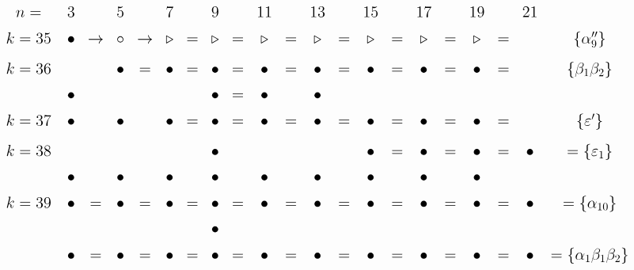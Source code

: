 \documentclass{article}
\begin{document}
\(
\begin{tikzcd}[nodes={font=\Large},row sep=0.2cm,column sep=0.1cm]
n= & & 3 & & 5 & & 7 & & 9 & & 11 & & 13 & & 15 & & 17 && 19 && 21  \\
k=35 && \bullet &\rightarrow& \circ &\rightarrow& \triangleright &=& \triangleright &=& \triangleright &=& \triangleright &=& \triangleright  &=& \triangleright &=& \triangleright &=& & \{\alpha''_9\} \\
k=36 && && \bullet &=& \bullet &=& \bullet &=& \bullet &=& \bullet &=& \bullet &=& \bullet &=& \bullet &=&& \{\beta_1\beta_2\} \\
&& \bullet && && && \bullet &=& \bullet && \bullet \\
k=37 && \bullet && \bullet && \bullet &=& \bullet &=& \bullet &=& \bullet &=& \bullet &=& \bullet &=& \bullet &=&& \{\varepsilon'\} \\
k=38 && && && && \bullet && && && \bullet &=& \bullet &=& \bullet &=& \bullet & =\{\varepsilon_1\} \\
 && \bullet && \bullet && \bullet && \bullet && \bullet && \bullet && \bullet && \bullet && \bullet \\
k=39 && \bullet &=& \bullet &=& \bullet &=& \bullet &=& \bullet &=& \bullet &=& \bullet &=& \bullet  &=& \bullet &=& \bullet& = \{\alpha_{10}\} \\
 && && && && \bullet && && && \\
&& \bullet &=& \bullet &=& \bullet &=& \bullet &=& \bullet &=& \bullet &=& \bullet &=& \bullet  &=& \bullet &=& \bullet& = \{\alpha_{1}\beta_1\beta_2\} \\
\\
\end{tikzcd}
\)
\end{document}
